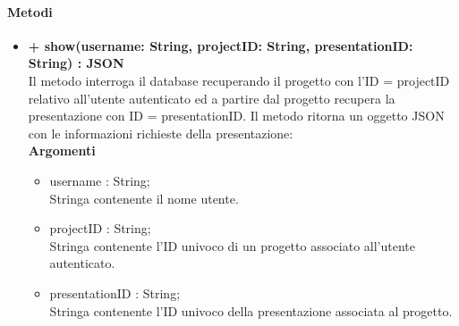 	\paragraph{Metodi}
		\begin{itemize}
			\item \textbf{+ show(username: String, projectID: String, presentationID: String) : JSON}\\
			Il metodo interroga il \gls{database} recuperando il progetto con l'ID = projectID relativo all'utente autenticato ed a partire dal progetto recupera la presentazione con ID = presentationID. Il metodo ritorna un oggetto \gls{JSON} con le informazioni richieste della presentazione:\\
			\textbf{Argomenti}
			\begin{itemize}
				\item username : String; \\
				Stringa contenente il nome utente.
				\item projectID : String; \\
				Stringa contenente l'ID univoco di un progetto associato all'utente autenticato.
				\item presentationID : String; \\
				Stringa contenente l'ID univoco della presentazione associata al progetto.
			\end{itemize}
			

\end{itemize}
